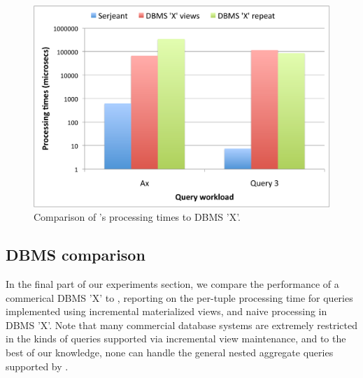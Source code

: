 \begin{figure}[htbp]
\begin{center}
\includegraphics[scale=0.32]{figures/dbcomp}
\end{center}
\vspace{-4mm}
\caption{Comparison of \compiler's processing times to DBMS 'X'.}
\label{fig:dbcomp}
\end{figure}


\subsection{DBMS comparison}
In the final part of our experiments section, we compare the performance of a
commerical DBMS 'X' to \compiler, reporting on the per-tuple processing time for
queries implemented using incremental materialized views, and naive processing
in DBMS 'X'. Note that many commercial database systems are extremely restricted
in the kinds of queries supported via incremental view maintenance, and to the
best of our knowledge, none can handle the general nested aggregate queries
supported by \compiler.



